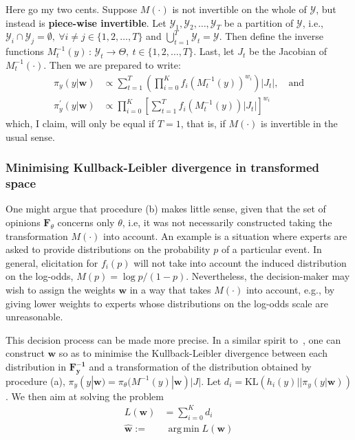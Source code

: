 \documentclass[11pt]{article}
\DeclareMathOperator*{\argmin}{arg\,min}
\begin{document}
Here go my two cents.
Suppose $M(\cdot)$ is not invertible on the whole of $\mathcal{Y}$, but instead is \textbf{piece-wise invertible}.
Let $\mathcal{Y}_1, \mathcal{Y}_2, \ldots, \mathcal{Y}_T$ be a  partition of $\mathcal{Y}$, i.e., $\mathcal{Y}_i\cap\mathcal{Y}_j = \emptyset,\: \forall i\neq j \in \{1, 2, \ldots, T\}$ and $\bigcup_{t = 1}^T\mathcal{Y}_t = \mathcal{Y}$.
Then define the inverse functions $M_{t}^{-1}(y)\,:\, \mathcal{Y}_t \to \Theta, \: t \in \{1, 2, \ldots, T\}$.
Last, let $J_t$ be the Jacobian of $M_{t}^{-1}(\cdot)$.
Then we are prepared to write:
\begin{align}
\label{eq:piecewiseTransf}
\pi_{y}(y |\mathbf{w}) &\propto \sum_{t = 1}^T\left(\prod_{i=0}^K f_i(M_t^{-1}(y))^{w_i}\right)|J_t|, \quad \text{and}\\
\pi^{\prime}_{y}(y|\mathbf{w}) &\propto \prod_{i=0}^K\left[\sum_{t = 1}^T f_i(M_t^{-1}(y))|J_t|\right]^{w_i}
\end{align}
which, I claim, will only be equal if $T = 1$, that is,  if $M(\cdot)$ is invertible in the usual sense.


\subsubsection{Minimising Kullback-Leibler divergence in transformed space}

One might argue that procedure (b) makes little sense, given that the set of opinions $\mathbf{F}_{\theta}$ concerns only $\theta$, i.e, it was not necessarily constructed taking the transformation $M(\cdot)$ into account.
An example is a situation where experts are asked to provide distributions on the probability $p$ of a particular event.
In general, elicitation for $f_i(p)$ will not take into account the induced distribution on the log-odds, $M(p) = \log p/(1-p)$.
Nevertheless, the decision-maker may wish to assign the weights $\mathbf{w}$ in a way that takes $M(\cdot)$ into account, e.g., by giving lower weights to experts whose distributions on the log-odds scale are unreasonable.

This decision process can be made more precise.
In a similar spirit to~\citep{carvalho2016}, one can construct $\mathbf{w}$ so as to minimise the Kullback-Leibler divergence between each distribution in $\mathbf{F^{-1}_y}$ and a transformation of the distribution obtained by procedure (a), $\pi_{y}(y | \mathbf{w}) = \pi_{\theta}( M^{-1}(y)| \mathbf{w})|J|$.
Let $d_i = \text{KL}( h_i(y) || \pi_{y}(y | \mathbf{w}))$.
We then aim at solving the problem
\begin{align}
L(\mathbf{w}) &= \sum_{i=0}^Kd_i \\
     \hat{\mathbf{w}}:=& \:\argmin L(\mathbf{w})  \nonumber
\end{align}
\end{document}
